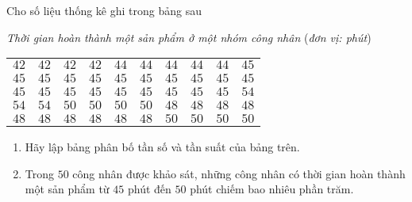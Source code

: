 \begin{vd}
Cho số liệu thống kê ghi trong bảng sau
\begin{center}
\textit{Thời gian hoàn thành một sản phẩm ở một nhóm công nhân} (\textit{đơn vị: phút})\bigskip\\
\begin{tabular}{|llllllllll|}
\hline 
$42$ & $42$ & $42$ & $42$ & $44$ & $44$ & $44$ & $44$ & $44$ & $45$ \\ 
$45$ & $45$ & $45$ & $45$ & $45$ & $45$ & $45$ & $45$ & $45$ & $45$ \\ 
$45$ & $45$ & $45$ & $45$ & $45$ & $45$ & $45$ & $45$ & $45$ & $54$ \\ 
$54$ & $54$ & $50$ & $50$ & $50$ & $50$ & $48$ & $48$ & $48$ & $48$ \\ 
$48$ & $48$ & $48$ & $48$ & $48$ & $48$ & $50$ & $50$ & $50$ & $50$ \\ 
\hline 
\end{tabular}
\end{center}
\begin{enumerate}
\item Hãy lập bảng phân bố tần số và tần suất của bảng trên.
\item Trong $50$ công nhân được khảo sát, những công nhân có thời gian hoàn thành một sản phẩm từ $45$ phút đến $50$ phút chiếm bao nhiêu phần trăm.
\end{enumerate}
\end{vd}

